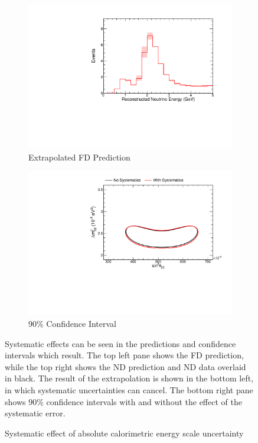 {\begin{figure}
\begin{center}
\begin{subfigure}[c]{0.49\textwidth}
\includegraphics[width=\textwidth]{figures/systs/prediction/fd_extrap_prediction_calScaleAbs.pdf}
\caption*{Extrapolated FD Prediction}
\end{subfigure}
\begin{subfigure}[c]{0.49\textwidth}
\includegraphics[width=\textwidth]{figures/systs/prediction/fd_extrap_contour_calScaleAbs.pdf}
\caption*{90\% Confidence Interval}
\end{subfigure}
\end{center}
\caption{Systematic effect of absolute calorimetric energy scale uncertainty}{
Systematic effects can be seen in the predictions and confidence intervals
which result.
The top left pane shows the FD prediction, while the top right shows the
ND prediction and ND data overlaid in black.
The result of the extrapolation is shown in the bottom left, in which
systematic uncertainties can cancel.
The bottom right pane shows 90\% confidence intervals with and without
the effect of the systematic error.}
\label{syst_fig_calScaleAbs}


\end{figure}}
